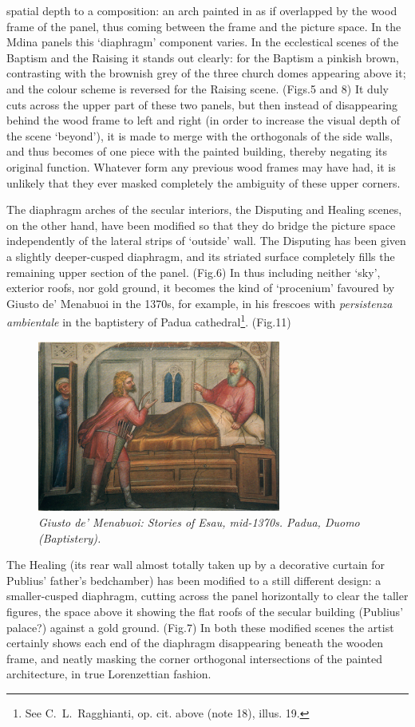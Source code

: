 \documentclass[a4paper,12pt]{article}
\begin{document}
spatial depth to a composition: an arch painted in as if overlapped by
the wood frame of the panel, thus coming between the frame and the
picture space. In the Mdina panels this `diaphragm' component
varies. In the ecclestical scenes of the Baptism and the Raising it
stands out clearly: for the Baptism a pinkish brown, contrasting with
the brownish grey of the three church domes appearing above it; and
the colour scheme is reversed for the Raising scene. (Figs.5 and 8) It
duly cuts across the upper part of these two panels, but then instead
of disappearing behind the wood frame to left and right (in order to
increase the visual depth of the scene `beyond'), it is made to merge
with the orthogonals of the side walls, and thus becomes of one piece
with the painted building, thereby negating its original
function. Whatever form any previous wood frames may have had, it is
unlikely that they ever masked completely the ambiguity of these upper
corners.

The diaphragm arches of the secular interiors, the Disputing and
Healing scenes, on the other hand, have been modified so that they do
bridge the picture space independently of the lateral strips of
`outside' wall.  The Disputing has been given a slightly deeper-cusped
diaphragm, and its striated surface completely fills the remaining
upper section of the panel. (Fig.6) In thus including neither `sky',
exterior roofs, nor gold ground, it becomes the kind of `procenium'
favoured by Giusto de' Menabuoi in the 1370s, for example, in his
frescoes with \textit{persistenza ambientale} in the baptistery of
Padua cathedral\footnote{See C.~L.~Ragghianti, op. cit. above (note
18), illus. 19.}. (Fig.11) 
\begin{figure}[htbp]
\centering
\includegraphics[width=8cm]{pics/fig11.png}
\caption[Giusto de' Menabuoi: Stories of Esau, mid-1370s]
{\it Giusto de' Menabuoi: Stories of Esau, mid-1370s.  Padua, Duomo
(Baptistery).} 
\end{figure}
The Healing (its rear wall almost totally
taken up by a decorative curtain for Publius' father's bedchamber) has
been modified to a still different design: a smaller-cusped diaphragm,
cutting across the panel horizontally to clear the taller figures, the
space above it showing the flat roofs of the secular building
(Publius' palace?) against a gold ground. (Fig.7) In both these
modified scenes the artist certainly shows each end of the diaphragm
disappearing beneath the wooden frame, and neatly masking the corner
orthogonal intersections of the painted architecture, in true
Lorenzettian fashion.
\end{document}
